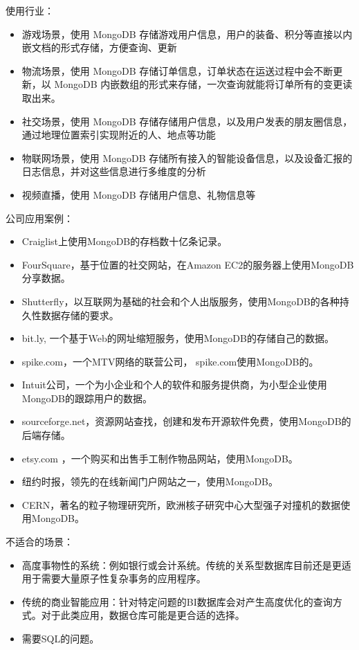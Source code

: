 \documentclass[11pt, a4paper, oneside]{ctexart}
\begin{document}
使用行业：
\begin{itemize}
    \item 游戏场景，使用 MongoDB 存储游戏用户信息，用户的装备、积分等直接以内嵌文档的形式存储，方便查询、更新
    \item 物流场景，使用 MongoDB 存储订单信息，订单状态在运送过程中会不断更新，以 MongoDB 内嵌数组的形式来存储，一次查询就能将订单所有的变更读取出来。
    \item 社交场景，使用 MongoDB 存储存储用户信息，以及用户发表的朋友圈信息，通过地理位置索引实现附近的人、地点等功能
    \item 物联网场景，使用 MongoDB 存储所有接入的智能设备信息，以及设备汇报的日志信息，并对这些信息进行多维度的分析
    \item 视频直播，使用 MongoDB 存储用户信息、礼物信息等
\end{itemize}
公司应用案例：
\begin{itemize}
    \item Craiglist上使用MongoDB的存档数十亿条记录。
    \item FourSquare，基于位置的社交网站，在Amazon EC2的服务器上使用MongoDB分享数据。
    \item Shutterfly，以互联网为基础的社会和个人出版服务，使用MongoDB的各种持久性数据存储的要求。
    \item bit.ly, 一个基于Web的网址缩短服务，使用MongoDB的存储自己的数据。
    \item spike.com，一个MTV网络的联营公司， spike.com使用MongoDB的。
    \item Intuit公司，一个为小企业和个人的软件和服务提供商，为小型企业使用MongoDB的跟踪用户的数据。
    \item sourceforge.net，资源网站查找，创建和发布开源软件免费，使用MongoDB的后端存储。
    \item etsy.com ，一个购买和出售手工制作物品网站，使用MongoDB。
    \item 纽约时报，领先的在线新闻门户网站之一，使用MongoDB。
    \item CERN，著名的粒子物理研究所，欧洲核子研究中心大型强子对撞机的数据使用MongoDB。
\end{itemize}
不适合的场景：
\begin{itemize}
    \item 高度事物性的系统：例如银行或会计系统。传统的关系型数据库目前还是更适用于需要大量原子性复杂事务的应用程序。
    \item 传统的商业智能应用：针对特定问题的BI数据库会对产生高度优化的查询方式。对于此类应用，数据仓库可能是更合适的选择。
    \item 需要SQL的问题。
\end{itemize}
\end{document}
